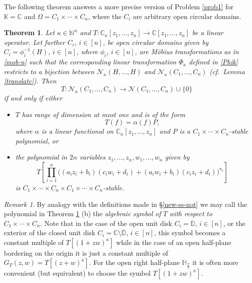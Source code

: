 \documentclass[10pt,reqno]{amsart}
\theoremstyle{plain}
\newtheorem{theorem}{Theorem}[section]
\theoremstyle{definition}
\theoremstyle{remark}
\newtheorem{remark}{Remark}[section]
\numberwithin{equation}{section}
\newcommand{\NN}{\mathbb{N}}
\newcommand{\bH}{\mathbb{H}}
\newcommand{\NV}{\mathcal{N}}
\newcommand{\CC}{\mathbb{C}}
\newcommand{\DD}{\mathbb{D}}
\newcommand{\KK}{\mathbb{K}}
\begin{document}
The following theorem answers a more precise version of 
Problem \ref{prob1} for $\KK=\CC$ and 
$\Omega=C_1\times\cdots\times C_n$, where the $C_i$ are arbitrary open 
circular domains.

\begin{theorem}\label{th-prod-circ}
Let $\kappa \in \NN^n$ and $T : \CC_\kappa[z_1,\ldots, z_n] \rightarrow 
\CC[z_1,\ldots, z_n]$ be a linear operator. Let further 
$C_i$, $i\in [n]$, be open 
circular domains given by $C_i=\phi_i^{-1}(H)$, $i\in [n]$, 
where 
$\phi_i$, $i\in [n]$, are M\"obius transformations as in \eqref{mob-n} 
such that the corresponding linear transformation $\Phi_\kappa$ defined in 
\eqref{Phik} restricts to 
a bijection between $\NV_\kappa(H,\ldots,H)$ and  $\NV_\kappa(C_1,\ldots,C_n)$ 
 (cf.~Lemma \ref{translate}). Then
$$
T:\NV_\kappa(C_1,\ldots,C_n)\to \NV(C_1,\ldots,C_n)\cup \{0\}
$$
if and only if either
\begin{itemize}
\item[(a)] $T$ has range of dimension at most one and is of the form 
$$
T(f) = \alpha(f)P,
$$
where $\alpha$ is a linear functional on $\CC_\kappa[z_1,\ldots, z_n]$ and 
$P$ is a $C_1\times \cdots \times C_n$-stable polynomial, or 
\item[(b)] the polynomial in $2n$ variables $z_1,\ldots,z_n,w_1,\ldots,w_n$ 
given by
$$
T\left[\prod_{i=1}^{n}
\big((a_iz_i+b_i)(c_iw_i+d_i)+(a_iw_i+b_i)(c_iz_i+d_i)\big)^{\kappa_i}\right]
$$ 
is $C_1\times \cdots \times C_n\times C_1\times \cdots \times C_n$-stable. 
\end{itemize}
\end{theorem}

\begin{remark}\label{unit-disk}
By analogy with the definitions made in \S \ref{new-ss-not} we may call the
 polynomial in 
Theorem \ref{th-prod-circ} (b) the {\em algebraic symbol of} $T$ {\em with 
respect to} $C_1\times \cdots \times C_n$. Note that in the case of the open 
unit disk $C_i=\DD$, $i\in [n]$, or the exterior of the closed unit disk 
$C_i=\CC\setminus \overline{\DD}$, $i\in [n]$, this 
symbol becomes a constant multiple of 
$T[(1+zw)^\kappa]$ while in the case of an open half-plane bordering on 
the origin it is just a constant multiple of $G_T(z,w)=T[(z+w)^\kappa]$. 
For the open right
half-plane $\bH_{\frac{\pi}{2}}$ it is often more convenient 
(but equivalent) to choose the symbol $T[(1+zw)^\kappa]$. 
\end{remark}
\end{document}
